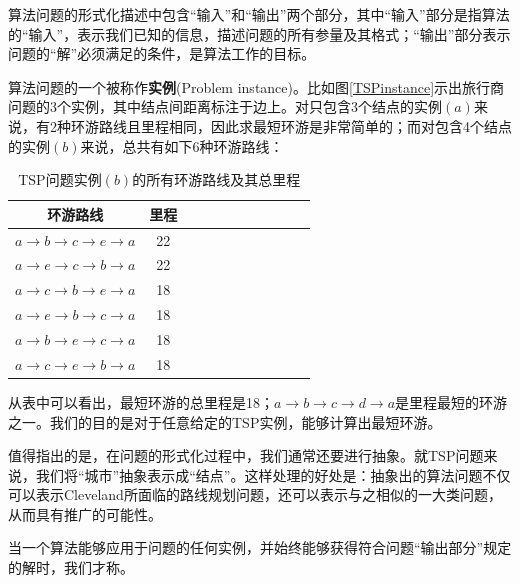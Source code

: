 	算法问题的形式化描述中包含“输入”和“输出”两个部分，其中“输入”部分是指算法的“输入”，表示我们已知的信息，描述问题的所有参量及其格式；“输出”部分表示问题的“解”必须满足的条件，是算法工作的目标。
	
	算法问题的一个被称作{\bf 实例}(Problem instance)。比如图\ref{TSPinstance}示出旅行商问题的3个实例，其中结点间距离标注于边上。对只包含3个结点的实例$(a)$来说，有2种环游路线且里程相同，因此求最短环游是非常简单的；而对包含4个结点的实例$(b)$来说，总共有如下6种环游路线：	
	
\begin{table}[htp]
	\centering
	\begin{tabular}{ccccccccccc}
		\hline
		环游路线 & 里程 \\
		\hline
			$a \rightarrow b \rightarrow c \rightarrow e \rightarrow a $  & 22 \\
			$a \rightarrow e \rightarrow c \rightarrow b \rightarrow a $  & 22 \\
			$a \rightarrow c \rightarrow b \rightarrow e \rightarrow a $  & 18 \\
			$a \rightarrow e \rightarrow b \rightarrow c \rightarrow a $  & 18 \\
			$a \rightarrow b \rightarrow e \rightarrow c \rightarrow a $  & 18 \\
			$a \rightarrow c \rightarrow e \rightarrow b \rightarrow a $  & 18 \\
		\hline
	\end{tabular}
	\caption{\fangsong TSP问题实例$(b)$的所有环游路线及其总里程}
\end{table}
	从表中可以看出，最短环游的总里程是18；$a \rightarrow b \rightarrow c \rightarrow d \rightarrow a $是里程最短的环游之一。我们的目的是对于任意给定的TSP实例，能够计算出最短环游。
	
	值得指出的是，在问题的形式化过程中，我们通常还要进行抽象。就TSP问题来说，我们将“城市”抽象表示成“结点”。这样处理的好处是：抽象出的算法问题不仅可以表示Cleveland所面临的路线规划问题，还可以表示与之相似的一大类问题，从而具有推广的可能性。
	
	当一个算法能够应用于问题的任何实例，并始终能够获得符合问题“输出部分”规定的解时，我们才称。
	
